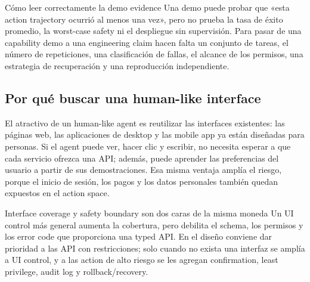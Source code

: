 
\begin{warningbox}{Cómo leer correctamente la demo evidence}
Una demo puede probar que «esta action trajectory ocurrió al menos una vez», pero no prueba la tasa de éxito promedio, la worst-case safety ni el despliegue sin supervisión. Para pasar de una capability demo a una engineering claim hacen falta un conjunto de tareas, el número de repeticiones, una clasificación de fallas, el alcance de los permisos, una estrategia de recuperación y una reproducción independiente.
\end{warningbox}


\subsection{Por qué buscar una human-like interface}

El atractivo de un human-like agent es reutilizar las interfaces existentes: las páginas web, las aplicaciones de desktop y las mobile app ya están diseñadas para personas. Si el agent puede ver, hacer clic y escribir, no necesita esperar a que cada servicio ofrezca una API; además, puede aprender las preferencias del usuario a partir de sus demostraciones. Esa misma ventaja amplía el riesgo, porque el inicio de sesión, los pagos y los datos personales también quedan expuestos en el action space.


\begin{importantbox}{Interface coverage y safety boundary son dos caras de la misma moneda}
Un UI control más general aumenta la cobertura, pero debilita el schema, los permisos y los error code que proporciona una typed API. En el diseño conviene dar prioridad a las API con restricciones; solo cuando no exista una interfaz se amplía a UI control, y a las action de alto riesgo se les agregan confirmation, least privilege, audit log y rollback/recovery.
\end{importantbox}

